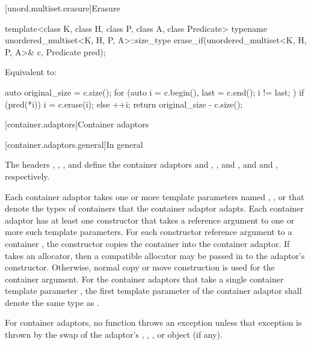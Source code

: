 [unord.multiset.erasure]{Erasure}

%
\begin{itemdecl}
template<class K, class H, class P, class A, class Predicate>
  typename unordered_multiset<K, H, P, A>::size_type
    erase_if(unordered_multiset<K, H, P, A>& c, Predicate pred);
\end{itemdecl}

\begin{itemdescr}
\pnum
\effects
Equivalent to:
\begin{codeblock}
auto original_size = c.size();
for (auto i = c.begin(), last = c.end(); i != last; ) {
  if (pred(*i)) {
    i = c.erase(i);
  } else {
    ++i;
  }
}
return original_size - c.size();
\end{codeblock}
\end{itemdescr}

[container.adaptors]{Container adaptors}

[container.adaptors.general]{In general}

\pnum
The headers
,
,
,
and 
define the container adaptors
 and ,
,
 and ,
and  and ,
respectively.

\pnum
Each container adaptor takes
one or more template parameters
named , , or 
that denote the types of containers that the container adaptor adapts.
Each container adaptor has at least one constructor
that takes a reference argument to one or more such template parameters.
For each constructor reference argument to a container ,
the constructor copies the container into the container adaptor.
If  takes an allocator, then a compatible allocator may be passed in
to the adaptor's constructor. Otherwise, normal copy or move construction is used for the container
argument.
For the container adaptors
that take a single container template parameter ,
the first template parameter  of the container adaptor
shall denote the same type as .

\pnum
For container adaptors, no  function throws an exception unless that
exception is thrown by the swap of the adaptor's
,
,
, or
 object (if any).

